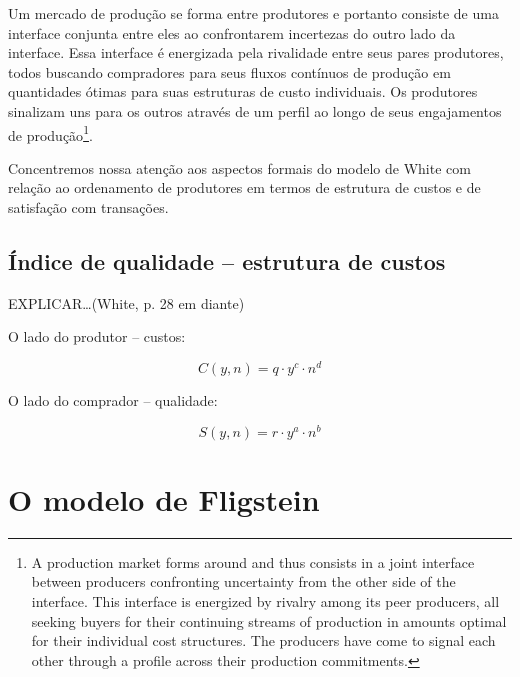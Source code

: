 \documentclass[a4paper, 12pt, openright, oneside, german, french, english, brazil]{abntex2}
\begin{document}
	\begin{citacao}
		Um mercado de produção se forma entre produtores e portanto consiste de uma interface conjunta entre eles ao confrontarem incertezas do outro lado da interface. Essa interface é energizada pela rivalidade entre seus pares produtores, todos buscando compradores para seus fluxos contínuos de produção em quantidades ótimas para suas estruturas de custo individuais. Os produtores sinalizam uns para os outros através de um perfil ao longo de seus engajamentos de produção\footnote{A production market forms around and thus consists in a joint interface between producers confronting uncertainty from the other side of the interface. This interface is energized by rivalry among its peer producers, all seeking buyers for their continuing streams of production in amounts optimal for their individual cost structures. The producers have come to signal each other through a profile across their production commitments.}. \cite[p. 27]{white2002markets}
	\end{citacao}
	
	Concentremos nossa atenção aos aspectos formais do modelo de White com relação ao ordenamento de produtores em termos de estrutura de custos e de satisfação com transações.
	
	\subsection{Índice de qualidade -- estrutura de custos}
	
	EXPLICAR\ldots (White, p. 28 em diante)
	
	O lado do produtor -- custos:
	
	\begin{equation}
	\label{eq-custos}
	C(y, n) = q \cdot y^c \cdot n^d
	\end{equation}
	
	O lado do comprador -- qualidade:
	
	\begin{equation}
	\label{eq-qualidade}
	S(y, n) = r \cdot y^a \cdot n^b
	\end{equation}
	
	
	
	\section{O modelo de Fligstein}
	
\end{document}
